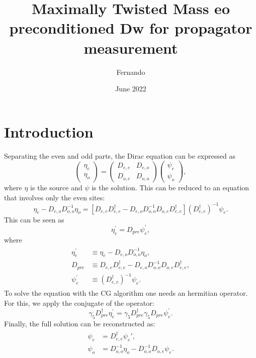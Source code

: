 \documentclass{article}
\title{Maximally Twisted Mass eo preconditioned Dw for propagator measurement}
\author{Fernando }
\date{June 2022}
\begin{document}
\maketitle

\section{Introduction}

Separating the even and odd parts, the Dirac equation can be expressed as
\begin{equation}
\left(\begin{array}{l}
\eta_{e} \\
\eta_{o}
\end{array}\right)=\left(\begin{array}{cc}
D_{e, e} & D_{e, o} \\
D_{o, e} & D_{o, o}
\end{array}\right)\left(\begin{array}{l}
\psi_{e} \\
\psi_{o}
\end{array}\right),
\end{equation}
where $\eta$ is the source and $\psi$ is the solution. This can be reduced to an equation that involves only the even sites:
\begin{equation}
    \eta_{e}-D_{e, o} D_{o, o}^{-1} \eta_{o}=\left[D_{e, e} D_{e, e}^{\dagger}-D_{e, o} D_{o, o}^{-1} D_{o, e} D_{e, e}^{\dagger}\right]\left(D_{e, e}^{\dagger}\right)^{-1} \psi_{e}.
\end{equation}
This can be seen as
\begin{equation}
\eta_{e}^{\prime}=D_{p r e} \psi_{e}^{\prime},
\end{equation}
where
\begin{align}
\begin{split}
\eta_{e}^{\prime} &\equiv \eta_{e}-D_{e, o} D_{o, o}^{-1} \eta_{o}, \\
D_{p r e} &\equiv D_{e, e} D_{e, e}^{\dagger}-D_{e, o} D_{o, o}^{-1} D_{o, e} D_{e, e}^{\dagger}, \\
\psi_{e}^{\prime} &\equiv\left(D_{e, e}^{\dagger}\right)^{-1} \psi_{e}.
\end{split}
\end{align}
To solve the equation with the CG algorithm one needs an hermitian operator. For this, we apply the conjugate of the operator:
\begin{equation}
\gamma_{5} D_{p r e}^{\dagger} \eta_{e}^{\prime}=\gamma_{5} D_{p r e}^{\dagger} \gamma_{5} D_{p r e} \psi_{e}^{\prime}.
\end{equation}
Finally, the full solution can be reconstructed as:
\begin{align}
\begin{split}
\psi_e &= D_{e, e}^{\dagger} \psi_e', \\
\psi_{o}&=D_{o, o}^{-1} \eta_{o}-D_{o, o}^{-1} D_{o, e} \psi_{e}.
\end{split}
\end{align}
\end{document}
